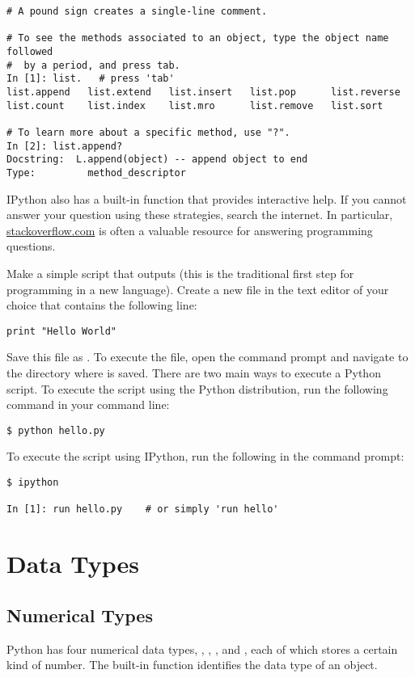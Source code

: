 \begin{lstlisting}
# A pound sign creates a single-line comment.

# To see the methods associated to an object, type the object name followed
#  by a period, and press tab.
In [1]: list.   # press 'tab'
list.append   list.extend   list.insert   list.pop      list.reverse  
list.count    list.index    list.mro      list.remove   list.sort

# To learn more about a specific method, use "?".
In [2]: list.append?
Docstring:  L.append(object) -- append object to end
Type:         method_descriptor
\end{lstlisting}

IPython also has a built-in function  that provides interactive help.
If you cannot answer your question using these strategies, search the internet.
In particular, \href{http://stackoverflow.com/}{stackoverflow.com} is often a valuable resource for answering programming questions.

\begin{problem}
Make a simple script that outputs  (this is the traditional first step for programming in a new language).
Create a new file in the text editor of your choice that contains the following line:
\begin{lstlisting}
print "Hello World"
\end{lstlisting}
Save this file as .
To execute the file, open the command prompt and navigate to the directory where  is saved.
There are two main ways to execute a Python script.
To execute the script using the Python distribution, run the following command in your command line:
\begin{lstlisting}
$ python hello.py
\end{lstlisting}
To execute the script using IPython, run the following in the command prompt:
\begin{lstlisting}
$ ipython

In [1]: run hello.py    # or simply 'run hello'
\end{lstlisting}
\end{problem}

\section*{Data Types}


\subsection*{Numerical Types}
Python has four numerical data types, , , 
, and , each of which stores a certain kind of number.
The built-in function  identifies the data type of an object.

